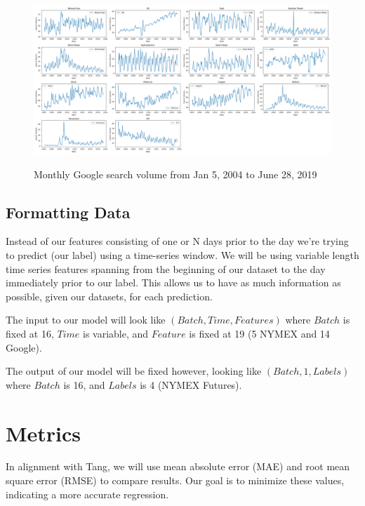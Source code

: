 \documentclass[final]{cvpr}
\begin{document}
    \begin{figure}[h]
        \caption{Monthly Google search volume from Jan 5, 2004 to June 28, 2019}
        \center
        \includegraphics[width=1.0\textwidth]{images/google_trends_data_monthly.png}
        \label{fig:google_trends_graph}
    \end{figure}

   
\subsection{Formatting Data}

    Instead of our features consisting of one or N days prior to the day we're 
    trying to predict (our label) using a time-series window. We will be using
    variable length time series features spanning from the beginning of our 
    dataset to the day immediately prior to our label. This allows us to have
    as much information as possible, given our datasets, for each prediction.

    The input to our model will look like $(Batch, Time, Features)$ where
    $Batch$ is fixed at 16, $Time$ is variable, and $Feature$ is fixed at 19 (5
    NYMEX and 14 Google).

    The output of our model will be fixed however, looking like $(Batch, 1, 
    Labels)$ where $Batch$ is 16, and $Labels$ is 4 (NYMEX Futures).

\section{Metrics}

    In alignment with Tang, we will use mean absolute error (MAE) and root mean
    square error (RMSE) to compare results. Our goal is to minimize these
    values, indicating a more accurate regression.
\end{document}
